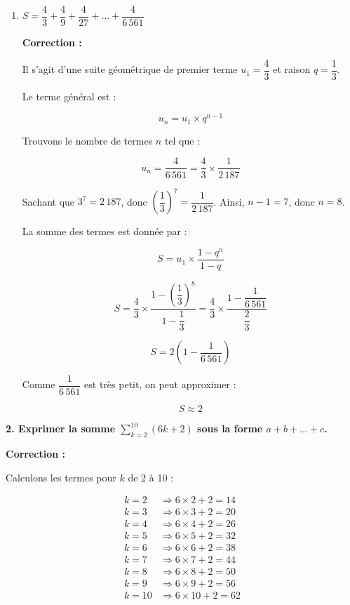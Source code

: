 \documentclass{article}
\begin{document}
\begin{enumerate}[label=\alph*)]
\[ n = 123 \]

La somme des termes est donnée par :

\[ S = \dfrac{n(u_1 + u_n)}{2} \]

\[ S = \dfrac{123(5 + 493)}{2} = \dfrac{123 \times 498}{2} = 61{,}5 \times 498 = 30\,657 \]

\bigskip

\item \( S = \dfrac{4}{3} + \dfrac{4}{9} + \dfrac{4}{27} + \dots + \dfrac{4}{6\,561} \)

\textbf{Correction :}

Il s'agit d'une suite géométrique de premier terme \( u_1 = \dfrac{4}{3} \) et raison \( q = \dfrac{1}{3} \).

Le terme général est :

\[ u_n = u_1 \times q^{n - 1} \]

Trouvons le nombre de termes \( n \) tel que :

\[ u_n = \dfrac{4}{6\,561} = \dfrac{4}{3} \times \dfrac{1}{2\,187} \]

Sachant que \( 3^7 = 2\,187 \), donc \( \left( \dfrac{1}{3} \right)^{7} = \dfrac{1}{2\,187} \). Ainsi, \( n - 1 = 7 \), donc \( n = 8 \).

La somme des termes est donnée par :

\[ S = u_1 \times \dfrac{1 - q^n}{1 - q} \]

\[ S = \dfrac{4}{3} \times \dfrac{1 - \left( \dfrac{1}{3} \right)^8}{1 - \dfrac{1}{3}} = \dfrac{4}{3} \times \dfrac{1 - \dfrac{1}{6\,561}}{\dfrac{2}{3}} \]

\[ S = 2 \left( 1 - \dfrac{1}{6\,561} \right) \]

Comme \( \dfrac{1}{6\,561} \) est très petit, on peut approximer :

\[ S \approx 2 \]

\end{enumerate}

\bigskip

\textbf{2. Exprimer la somme \( \displaystyle \sum_{k=2}^{10} (6k + 2) \) sous la forme \( a + b + \dots + c \).}

\textbf{Correction :}

Calculons les termes pour \( k \) de 2 à 10 :

\begin{align*}
k = 2 &\Rightarrow 6 \times 2 + 2 = 14 \\
k = 3 &\Rightarrow 6 \times 3 + 2 = 20 \\
k = 4 &\Rightarrow 6 \times 4 + 2 = 26 \\
k = 5 &\Rightarrow 6 \times 5 + 2 = 32 \\
k = 6 &\Rightarrow 6 \times 6 + 2 = 38 \\
k = 7 &\Rightarrow 6 \times 7 + 2 = 44 \\
k = 8 &\Rightarrow 6 \times 8 + 2 = 50 \\
k = 9 &\Rightarrow 6 \times 9 + 2 = 56 \\
k = 10 &\Rightarrow 6 \times 10 + 2 = 62 \\
\end{align*}
\end{document}
